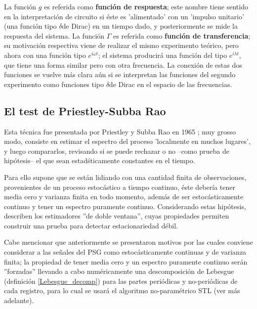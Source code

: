 \documentclass[12pt,a4paper]{mitthesis}
\newcommand{\ddd}{$\delta$}
\begin{document}
La funci\'on $g$ es referida como \textbf{funci\'on de respuesta}; este nombre tiene sentido en la
interpretaci\'on de circuito si \'este es 'alimentado' con un 'impulso unitario' (una funci\'on
tipo \ddd de Dirac) en un tiempo dado, y posteriormente se mide la respuesta del sistema.
La funci\'on $\Gamma$ es referida como \textbf{funci\'on de transferencia}; su motivaci\'on
respectiva viene de realizar el mismo experimento te\'orico, pero ahora con una funci\'on tipo 
$e^{i \omega t}$; el sistema producir\'a una funci\'on del tipo $e^{i\lambda t}$, que tiene una 
forma similar pero con otra frecuencia. La conexi\'on de estas dos funciones se vuelve m\'as clara 
a\'un si se interpretan las funciones del segundo experimento como funciones tipo \ddd de Dirac en 
el espacio de las frecuencias.


\subsection{El test de Priestley-Subba Rao}

Esta t\'ecnica fue presentada por Priestley y Subba Rao en 1965 \cite{Priestley69}; muy grosso 
modo, consiste en estimar el espectro del proceso 'localmente en muchos lugares', y luego 
compararlos, revisando si se puede rechazar o no --como prueba de hip\'otesis-- el que sean 
estad\'sticamente constantes en el tiempo.

Para ello supone que se est\'an lidiando con una cantidad finita de observaciones, provenientes de 
un proceso estoc\'astico a tiempo continuo, \'este deber\'ia tener media cero y varianza finita en 
todo momento, adem\'as de ser estoc\'asticamente continuo y tener un espectro puramente continuo.
Considerando estas hip\'otesis, describen los estimadores ''de doble ventana'', cuyas propiedades 
permiten construir una prueba para detectar estacionariedad d\'ebil.

Cabe mencionar que anteriormente se presentaron motivos por las cuales conviene considerar a las 
se\~nales del PSG como estoc\'asticamente continuas y de varianza finita; la propiedad de tener 
media cero y un espectro puramente continuo ser\'an ''forzadas'' llevando a cabo num\'ericamente
una descomposici\'on de Lebesgue (definici\'on \ref{Lebesgue_decomp}) para las partes peri\'odicas 
y no-peri\'odicas de cada registro, para lo cual se usar\'a el algoritmo no-param\'etrico STL (ver 
m\'as adelante).
\end{document}
